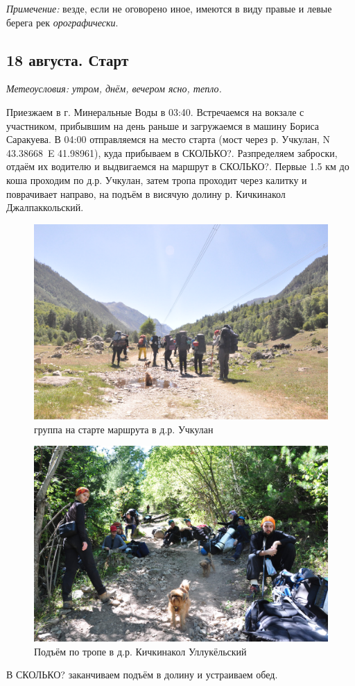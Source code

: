 \textit{Примечение:} везде, если не оговорено иное, имеются в виду правые и левые берега рек \textit{орографически}.
\subsection{18 августа. Старт}
\textit{Метеоусловия: утром, днём, вечером ясно, тепло.}

Приезжаем в г. Минеральные Воды в 03:40. Встречаемся на вокзале с участником, прибывшим на день раньше и загружаемся в машину Бориса Саракуева. В 04:00 отправляемся на место старта (мост через р. Учкулан, N 43.38668\degree~E 41.98961\degree), куда прибываем в \alert{СКОЛЬКО?}. Разпределяем заброски, отдаём их водителю и выдвигаемся на маршрут в \alert{СКОЛЬКО?}. Первые 1.5 км до коша проходим по д.р. Учкулан, затем тропа проходит через калитку и поврачивает направо, на подъём в висячую долину р. Кичкинакол Джалпаккольский.

\begin{figure}[h]
	\centering
	\includegraphics[width=0.7\linewidth]{../pics/DSC_0412}
	\caption{группа на старте маршрута в д.р. Учкулан}
	\label{fig:uchkulan}
\end{figure}


\begin{figure}[h]
	\centering
	\includegraphics[width=0.7\linewidth]{../pics/DSC_0436}
	\caption{Подъём по тропе в д.р. Кичкинакол Уллукёльский}
	\label{fig:DSC_0436}
\end{figure}
В \alert{СКОЛЬКО?} заканчиваем подъём в долину и устраиваем обед.

